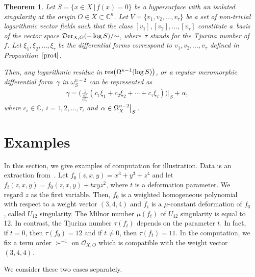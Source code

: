 \documentclass[10pt,a4paper]{amsart}
\numberwithin{equation}{section}
\newtheorem{Theorem}{Theorem}[section]
\begin{document}
\begin{Theorem}\label{Th6}
Let $S=\{ x \in X \,|\, f(x)=0\} $ be a hypersurface with an isolated singularity at the origin $ O \in X \subset {\mathbb C}^n$. Let $V=\{v_1, v_2,\ldots, v_{\tau}\} $ be a set of non-trivial logarithmic vector fields such that the class $[v_1], [v_2], \dots, [v_{\tau}]$ constitute a~basis of the vector space ${\mathcal D}{\rm er}_{X,O}(-\log S)/{\sim}$, where~$\tau$ stands for the Tjurina number of $f$. Let $\xi_1, \xi_2, \ldots, \xi_{\tau}$ be the differential forms correspond to
$v_1, v_2, \ldots, v_{\tau}$ defined in Proposition~$\ref{pro4}$.

Then, any logarithmic residue in ${\rm res}\big(\Omega^{n-1}(\log S)\big)$, or a regular meromorphic differential form~$\gamma$ in $\omega_S^{n-2}$ can be represented as
\begin{gather*}
\gamma = \bigg(\frac{1}{\frac{\partial f}{\partial x_1}}(c_1\xi_1+c_2\xi_2+ \cdots +c_{\tau}\xi_{\tau})\bigg)\bigg|_S + \alpha,
\end{gather*}
where $c_i \in {\mathbb C}$, $i=1,2,\dots, \tau$, and $ \left. \alpha \in \Omega_X^{n-2}\middle|\raisebox{-0.7ex}[1ex][-2ex]{{\hspace{-1mm}\;$_S$}}\right. $.
\end{Theorem}


\section{Examples}\label{sec4}

In this section, we give examples of computation for illustration. Data is an extraction from~\cite{TN20}. Let $f_0(z,x,y)=x^3+y^3+z^4 $ and let $ f_t(z,x,y)=f_0(z,x,y)+txyz^2$,
where $t$ is a deformation parameter. We regard $z$ as the first variable. Then, $f_0$ is a weighted homogeneous polynomial with respect to a weight vector $(3,4,4)$ and $f_t$ is a $\mu$-constant deformation of $f_0$, called $U_{12}$ singularity. The Milnor number
$\mu(f_t)$ of $U_{12}$ singularity is equal to 12. In contrast, the Tjurina number
$\tau(f_t)$ depends on the parameter $t$. In fact, if $t=0$, then $\tau(f_0) = 12$ and if $t \ne 0$, then $\tau(f_t) =11$. In the computation, we fix a term order $\succ^{-1}$ on ${\mathcal O}_{X,O}$ which is compatible with the weight vector $(3,4,4)$.

We consider these two cases separately.
\end{document}

